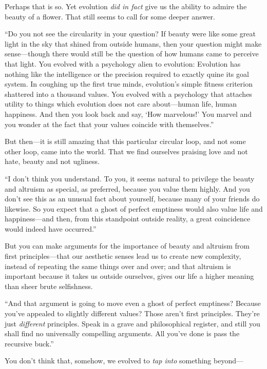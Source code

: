 {
 Perhaps that is so. Yet evolution \textit{did in fact} give us the
ability to admire the beauty of a flower. That still seems to call for
some deeper answer.}

{
 ``Do you not see the circularity in your
question? If beauty were like some great light in the sky that shined
from outside humans, then your question might make sense---though there
would still be the question of how humans came to perceive that light.
You evolved with a psychology alien to evolution: Evolution has nothing
like the intelligence or the precision required to exactly quine its
goal system. In coughing up the first true minds,
evolution's simple fitness criterion shattered into a
thousand values. You evolved with a psychology that attaches utility to
things which evolution does not care about---human life, human
happiness. And then you look back and say, `How
marvelous!' You marvel and you wonder at the fact that
your values coincide with themselves.''}

{
 But then---it is still amazing that this particular circular loop,
and not some other loop, came into the world. That we find ourselves
praising love and not hate, beauty and not ugliness.}

{
 ``I don't think you understand.
To you, it seems natural to privilege the beauty and altruism as
special, as preferred, because you value them highly. And you
don't see this as an unusual fact about yourself,
because many of your friends do likewise. So you expect that a ghost of
perfect emptiness would also value life and happiness---and then, from
this standpoint outside reality, a great coincidence would indeed have
occurred.''}

{
 But you can make arguments for the importance of beauty and
altruism from first principles---that our aesthetic senses lead us to
create new complexity, instead of repeating the same things over and
over; and that altruism is important because it takes us outside
ourselves, gives our life a higher meaning than sheer brute
selfishness.}

{
 ``And that argument is going to move even a ghost
of perfect emptiness? Because you've appealed to
slightly different values? Those aren't first
principles. They're just \textit{different} principles.
Speak in a grave and philosophical register, and still you shall find
no universally compelling arguments. All you've done is
pass the recursive buck.''}

{
 You don't think that, somehow, we evolved to
\textit{tap into} something beyond---}

